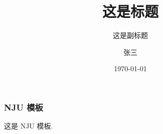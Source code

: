 \documentclass[12pt,aspectratio=169,mathserif]{beamer}
\title{这是标题}
\subtitle{这是副标题}
\author{
    张三
   }
\date{\today}
\begin{document}
\maketitle
	\begin{frame}
		\frametitle{NJU 模板}
		这是 NJU 模板.
	\end{frame}
\end{document}
